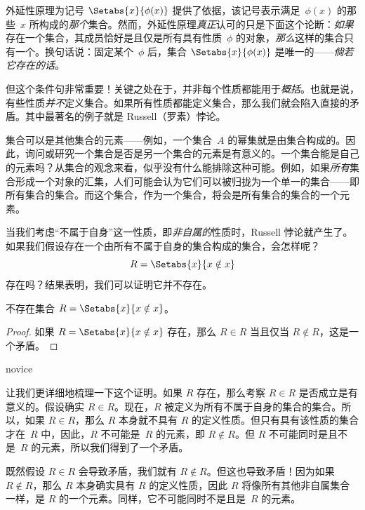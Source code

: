 \documentclass[../../../include/open-logic-section]{subfiles}
\begin{document}


外延性原理为记号 $\Setabs{x}{\phi(x)}$ 提供了依据，该记号表示满足~$\phi(x)$ 的那些~$x$ 所构成的\emph{那个}集合。然而，外延性原理\emph{真正}认可的只是下面这个论断：\emph{如果}存在一个集合，其成员恰好是且仅是所有具有性质~$\phi$ 的对象，\emph{那么}这样的集合只有一个。换句话说：固定某个~$\phi$ 后，集合 $\Setabs{x}{\phi(x)}$ 是唯一的——\emph{倘若它存在的话}。

但这个条件句非常重要！关键之处在于，并非每个性质都能用于\emph{概括}。也就是说，有些性质\emph{并不}定义集合。如果所有性质都能定义集合，那么我们就会陷入直接的矛盾。其中最著名的例子就是 Russell（罗素）悖论。

集合可以是其他集合的元素——例如，一个集合~$A$ 的幂集就是由集合构成的。因此，询问或研究一个集合是否是另一个集合的元素是有意义的。一个集合能是自己的元素吗？从集合的观念来看，似乎没有什么能排除这种可能。例如，如果\emph{所有}集合形成一个对象的汇集，人们可能会认为它们可以被归拢为一个单一的集合——即所有集合的集合。而这个集合，作为一个集合，将会是所有集合的集合的一个元素。

当我们考虑“不属于自身”这一性质，即\emph{非自属的}性质时，Russell 悖论就产生了。如果我们假设存在一个由所有不属于自身的集合构成的集合，会怎样呢？
\[
R = \Setabs{x}{x \notin x}
\]
存在吗？结果表明，我们可以证明它并不存在。

\begin{thm}[Russell 悖论]
	不存在集合 $R = \Setabs{x}{x \notin x}$。
\end{thm}

\begin{proof}
如果 $R = \Setabs{x}{x \notin x}$ 存在，那么
$R \in R$ 当且仅当 $R \notin R$，这是一个矛盾。
\end{proof}

\begin{tagblock}{novice}
\begin{explain}
让我们更详细地梳理一下这个证明。如果 $R$ 存在，那么考察 $R \in R$ 是否成立是有意义的。假设确实 $R \in R$。现在，$R$ 被定义为所有不属于自身的集合的集合。所以，如果 $R \in R$，那么 $R$ 本身就不具有 $R$ 的定义性质。但只有具有该性质的集合才在~$R$ 中，因此，$R$ 不可能是~$R$ 的元素，即 $R \notin R$。但 $R$ 不可能同时是且不是~$R$ 的元素，所以我们得到了一个矛盾。

既然假设 $R \in R$ 会导致矛盾，我们就有 $R \notin R$。但这也导致矛盾！因为如果 $R
\notin R$，那么 $R$ 本身确实具有 $R$ 的定义性质，因此 $R$ 将像所有其他非自属集合一样，是 $R$ 的一个元素。同样，它不可能同时不是且是~$R$ 的元素。
\end{explain}
\end{tagblock}
\end{document}
